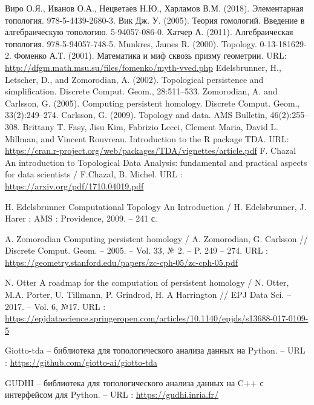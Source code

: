 \begin{thebibliography}{99}
	Виро О.Я., Иванов О.А., Нецветаев Н.Ю., Харламов В.М. (2018). Элементарная топология. 978-5-4439-2680-3.
	Вик Дж. У. (2005). Теория гомологий. Введение в алгебраическую топологию. 5-94057-086-0.
	Хатчер А. (2011). Алгебраическая топология. 978-5-94057-748-5.
	Munkres, James R. (2000). Topology. 0-13-181629-2.
	Фоменко А.Т. (2001). Математика и миф сквозь призму геометрии. URL: \url{http://dfgm.math.msu.su/files/fomenko/myth-vved.php}
	Edelsbrunner, H., Letscher, D., and Zomorodian, A. (2002). Topological persistence and simplification. Discrete Comput. Geom., 28:511–533.
	Zomorodian, A. and Carlsson, G. (2005). Computing persistent homology. Discrete Comput.
	Geom., 33(2):249–274.
	Carlsson, G. (2009). Topology and data. AMS Bulletin, 46(2):255–308.
	Brittany T. Fasy, Jisu Kim, Fabrizio Lecci, Clement
	Maria, David L. Millman, and Vincent Rouvreau. Introduction to the R package TDA. URL: \url{https://cran.r-project.org/web/packages/TDA/vignettes/article.pdf}
	F. Chazal An introduction to Topological Data Analysis: fundamental and practical aspects for data scientists / F.Chazal, B. Michel. URL : \url{https://arxiv.org/pdf/1710.04019.pdf}
	
	H. Edelsbrunner Computational Topology An Introduction / H. Edelsbrunner, J. Harer ; AMS : Providence, 2009. -- 241 с.
	
	A. Zomorodian Computing persistent homology / A. Zomorodian, G. Carlsson // Discrete Comput. Geom. -- 2005. -- Vol. 33, № 2. -- P. 249 -- 274. URL : \url{https://geometry.stanford.edu/papers/zc-cph-05/zc-cph-05.pdf}
	
	N. Otter A roadmap for the computation of persistent homology / N. Otter, M.A. Porter, U. Tillmann, P. Grindrod, H. A Harrington // EPJ Data Sci. -- 2017. -- Vol. 6, №17. URL : \url{https://epjdatascience.springeropen.com/articles/10.1140/epjds/s13688-017-0109-5}
	
	Giotto-tda -- библиотека для топологического анализа данных на Python. -- URL : \url{https://github.com/giotto-ai/giotto-tda}
	
	GUDHI -- библиотека для топологического анализа данных на C++ с интерфейсом для Python. -- URL : \url{https://gudhi.inria.fr/}
	

\end{thebibliography}
